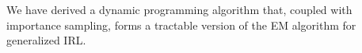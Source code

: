 % 
% 
% 

We have derived a dynamic programming algorithm that, coupled with
importance sampling, forms a tractable version of the EM algorithm for
generalized IRL.


